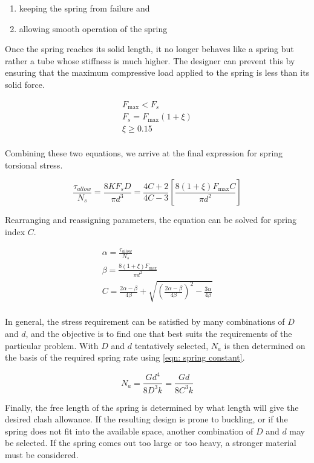 \documentclass[a4paper,openany,nobib]{tufte-book}
\begin{document}
{{\begin{enumerate}
\item keeping the spring from failure and

\item allowing smooth operation of the spring
\end{enumerate}

Once the spring reaches its solid length, it no longer behaves like a
spring but rather a tube whose stiffness is much higher. The designer
can prevent this by ensuring that the maximum compressive load applied
to the spring is less than its solid force.

$$\begin{gathered}
    F_{\max} < F_s \\ 
    F_s = F_{\max}(1 + \xi ) \\ 
    \xi  \geqslant 0.15 \\ 
  \end{gathered}$$

Combining these two equations, we arrive at the final expression for
spring torsional stress.

$$\frac{\tau _{allow}}{N_s} = \frac{8KF_sD}{\pi d^3} = \frac{4C + 2}{4C - 3}\left[ \frac{8(1 + \xi )F_{\max }C}{\pi d^2} \right]$$

Rearranging and reassigning parameters, the equation can be solved for
spring index \(C\).

$$\begin{gathered}
    \alpha  = \frac{\tau_{allow}}{N_s} \\ 
    \beta  = \frac{8(1 + \xi )F_{\max}}{\pi d^2} \\ 
    C = \frac{2\alpha  - \beta }{4\beta} + \sqrt {\left( \frac{2\alpha  - \beta}{4\beta} \right)^2 - \frac{3\alpha}{4\beta}}  \\ 
  \end{gathered}$$

In general, the stress requirement can be satisfied by many combinations
of \(D\) and \(d\), and the objective is to find one that best suits the
requirements of the particular problem. With \(D\) and \(d\) tentatively
selected, \(N_a\) is then determined on the basis of the required spring
rate using \ref{eqn: spring constant}.

$$N_a = \frac{Gd^4}{8D^3k} = \frac{Gd}{8C^3k}$$

Finally, the free length of the spring is determined by what length will
give the desired clash allowance. If the resulting design is prone to
buckling, or if the spring does not fit into the available space,
another combination of \(D\) and \(d\) may be selected. If the spring comes
out too large or too heavy, a stronger material must be considered.

}}
\end{document}
